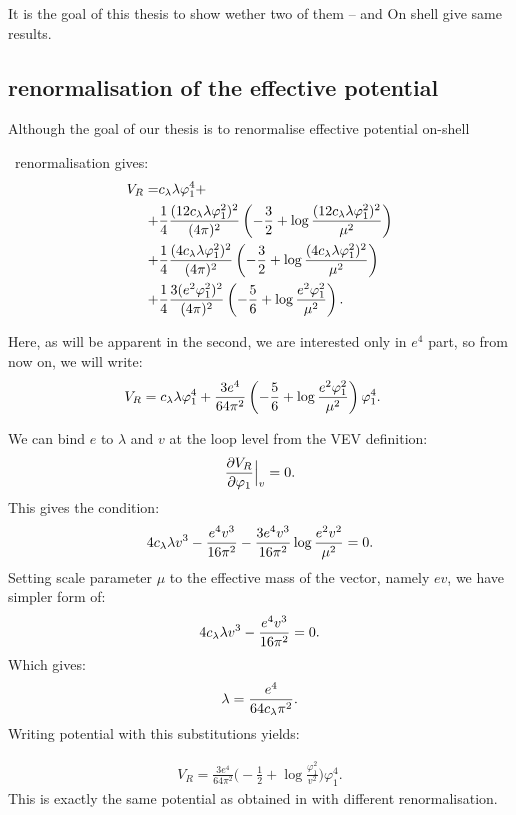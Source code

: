 It is the goal of this thesis to show wether two of them -- \MSbar and On shell give same results.


\subsection{\texorpdfstring{\MSbar}{MS-bar} renormalisation of the effective potential}
Although the goal of our thesis is to renormalise effective potential on-shell

\MSbar\ renormalisation gives:
\begin{align}
V_{R}=&c_\lambda\lambda\varphi_1^4 + \notag \\
+&\frac{1}{4}\frac{(12c_\lambda\lambda\varphi_1^2)^2}{(4\pi)^2}\left(-\frac{3}{2}+ 
\log{\frac{(12c_\lambda\lambda\varphi_1^2)^2}{\mu^2}}\right)\notag  \\
+&\frac{1}{4}\frac{(4c_\lambda\lambda\varphi_1^2)^2}{(4\pi)^2}\left(-\frac{3}{2}+ 
\log{\frac{(4c_\lambda\lambda\varphi_1^2)^2}{\mu^2}}\right) \notag \\
+&\frac{1}{4}\frac{3(e^2\varphi_1^2)^2}{(4\pi)^2}\left(-\frac{5}{6}+
\log{\frac{e^2\varphi_1^2}{\mu^2}}\right).
\end{align}

Here, as will be apparent in the second, we are interested only in $e^4$ part, so from now on, 
we will write:
\begin{align}
V_{R}=c_\lambda\lambda\varphi_1^4 + \frac{3e^4}{64\pi^2}&\left(-\frac{5}{6}+
\log{\frac{e^2\varphi_1^2}{\mu^2}}\right)\varphi_1^4.
\end{align}

We can bind $e$ to $\lambda$ and $v$ at the loop level from the VEV definition:
\begin{align}
\frac{\partial V_R}{\partial \varphi_1} \Big|_v= 0.
\end{align}
This gives the condition:
\begin{align}
4c_\lambda\lambda v^3-\frac{e^4v^3}{16\pi^2}-\frac{3e^4v^3}{16\pi^2}\log\frac{e^2v^2}{\mu^2}=0.
\end{align}
Setting scale parameter $\mu$ to the effective mass of the vector, namely $ev$, we have 
simpler form of:
\begin{align}
4c_\lambda\lambda v^3-\frac{e^4v^3}{16\pi^2}=0.
\end{align}
Which gives:
\begin{align}\label{e4_lambda_MS}
\lambda = \frac{e^4}{64c_\lambda\pi^2}.
\end{align}
Writing potential with this substitutions yields:

\begin{align}\label{MSbar_result}
V_R = \frac{3e^4}{64\pi^2}\Big(-\frac{1}{2}+\log\frac{\varphi_1^2}{v^2}\Big)\varphi_1^4.
\end{align}
This is exactly the same potential as obtained in \cite{Coleman1973} with different renormalisation.

